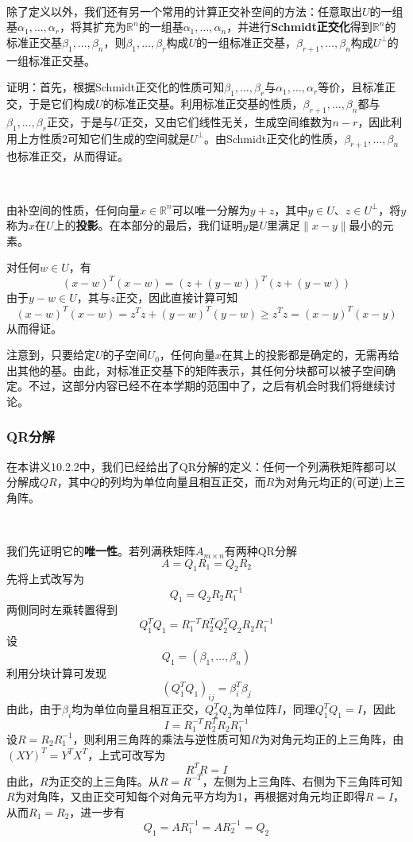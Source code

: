 \documentclass[a4paper,UTF8,fontset=windows]{ctexart}
\newcommand*{\note}{\noindent *}
\begin{document}
\

除了定义以外，我们还有另一个常用的计算正交补空间的方法：任意取出$U$的一组基$\alpha_1,\dots,\alpha_r$，将其扩充为$\mathbb{R}^n$的一组基$\alpha_1,\dots,\alpha_n$，并进行\textbf{Schmidt正交化}得到$\mathbb{R}^n$的标准正交基$\beta_1,\dots,\beta_n$，则$\beta_1,\dots,\beta_r$构成$U$的一组标准正交基，$\beta_{r+1},\dots,\beta_n$构成$U^\bot$的一组标准正交基。

证明：首先，根据Schmidt正交化的性质可知$\beta_1,\dots,\beta_r$与$\alpha_1,\dots,\alpha_r$等价，且标准正交，于是它们构成$U$的标准正交基。利用标准正交基的性质，$\beta_{r+1},\dots,\beta_n$都与$\beta_1,\dots,\beta_r$正交，于是与$U$正交，又由它们线性无关，生成空间维数为$n-r$，因此利用上方性质2可知它们生成的空间就是$U^\bot$。由Schmidt正交化的性质，$\beta_{r+1},\dots,\beta_n$也标准正交，从而得证。


\

由补空间的性质，任何向量$x\in\mathbb{R}^n$可以唯一分解为$y+z$，其中$y\in U$、$z\in U^\bot$，将$y$称为$x$在$U$上的\textbf{投影}。在本部分的最后，我们证明$y$是$U$里满足$\|x-y\|$最小的元素。

对任何$w\in U$，有
$$(x-w)^T(x-w)=(z+(y-w))^T(z+(y-w))$$
由于$y-w\in U$，其与$z$正交，因此直接计算可知
$$(x-w)^T(x-w)=z^Tz+(y-w)^T(y-w)\ge z^Tz=(x-y)^T(x-y)$$
从而得证。

\note 注意到，只要给定$U$的子空间$U_0$，任何向量$x$在其上的投影都是确定的，无需再给出其他的基。由此，对标准正交基下的矩阵表示，其任何分块都可以被子空间确定。不过，这部分内容已经不在本学期的范围中了，之后有机会时我们将继续讨论。

\subsubsection{QR分解}
在本讲义10.2.2中，我们已经给出了QR分解的定义：任何一个列满秩矩阵都可以分解成$QR$，其中$Q$的列均为单位向量且相互正交，而$R$为对角元均正的(可逆)上三角阵。

\

我们先证明它的\textbf{唯一性}。若列满秩矩阵$A_{m\times n}$有两种QR分解
$$A=Q_1R_1=Q_2R_2$$
先将上式改写为
$$Q_1=Q_2R_2R_1^{-1}$$
两侧同时左乘转置得到
$$Q_1^TQ_1=R_1^{-T}R_2^TQ_2^TQ_2R_2R_1^{-1}$$
设
$$Q_1=(\beta_1,\dots,\beta_n)$$
利用分块计算可发现
$$(Q_1^TQ_1)_{ij}=\beta_i^T\beta_j$$
由此，由于$\beta_i$均为单位向量且相互正交，$Q_2^TQ_2$为单位阵$I$，同理$Q_1^TQ_1=I$，因此
$$I=R_1^{-T}R_2^TR_2R_1^{-1}$$
设$R=R_2R_1^{-1}$，则利用三角阵的乘法与逆性质可知$R$为对角元均正的上三角阵，由$(XY)^T=Y^TX^T$，上式可改写为
$$R^TR=I$$
由此，$R$为正交的上三角阵。从$R=R^{-T}$，左侧为上三角阵、右侧为下三角阵可知$R$为对角阵，又由正交可知每个对角元平方均为1，再根据对角元均正即得$R=I$，从而$R_1=R_2$，进一步有
$$Q_1=AR_1^{-1}=AR_2^{-1}=Q_2$$
\end{document}
